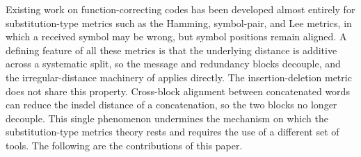 \documentclass[11 pt]{article}
\numberwithin{equation}{section}
\begin{document}
    
    
        
    Existing work on function-correcting codes has been developed almost entirely for substitution-type metrics such as the Hamming, symbol-pair, and Lee metrics, in which a received symbol may be wrong, but symbol positions remain aligned. A defining feature of all these metrics is that the underlying distance is additive across a systematic split, so the message and redundancy blocks decouple, and the irregular-distance machinery of \cite{10132545} applies directly. The insertion-deletion metric does not share this property. Cross-block alignment between concatenated words can reduce the insdel distance of a concatenation, so the two blocks no longer decouple. This single phenomenon undermines the mechanism on which the substitution-type metrics theory rests and requires the use of a different set of tools. The following are the contributions of this paper.
\end{document}

